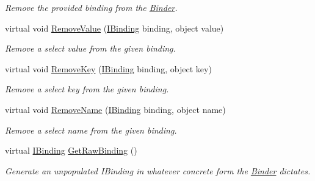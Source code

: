 \begin{DoxyCompactItemize}
\begin{DoxyCompactList}\small\item\em Remove the provided binding from the \hyperlink{classstrange_1_1framework_1_1impl_1_1_binder}{Binder}. \end{DoxyCompactList}\item 
\hypertarget{classstrange_1_1framework_1_1impl_1_1_binder_a09e00eb1f824e641fa287735a9f3b834}{virtual void \hyperlink{classstrange_1_1framework_1_1impl_1_1_binder_a09e00eb1f824e641fa287735a9f3b834}{Remove\-Value} (\hyperlink{interfacestrange_1_1framework_1_1api_1_1_i_binding}{I\-Binding} binding, object value)}\label{classstrange_1_1framework_1_1impl_1_1_binder_a09e00eb1f824e641fa287735a9f3b834}

\begin{DoxyCompactList}\small\item\em Remove a select value from the given binding. \end{DoxyCompactList}\item 
\hypertarget{classstrange_1_1framework_1_1impl_1_1_binder_a4cec7503f4f76e4f132665d89db49d99}{virtual void \hyperlink{classstrange_1_1framework_1_1impl_1_1_binder_a4cec7503f4f76e4f132665d89db49d99}{Remove\-Key} (\hyperlink{interfacestrange_1_1framework_1_1api_1_1_i_binding}{I\-Binding} binding, object key)}\label{classstrange_1_1framework_1_1impl_1_1_binder_a4cec7503f4f76e4f132665d89db49d99}

\begin{DoxyCompactList}\small\item\em Remove a select key from the given binding. \end{DoxyCompactList}\item 
\hypertarget{classstrange_1_1framework_1_1impl_1_1_binder_a834c55607151d7a30856e6b6f6a8df1e}{virtual void \hyperlink{classstrange_1_1framework_1_1impl_1_1_binder_a834c55607151d7a30856e6b6f6a8df1e}{Remove\-Name} (\hyperlink{interfacestrange_1_1framework_1_1api_1_1_i_binding}{I\-Binding} binding, object name)}\label{classstrange_1_1framework_1_1impl_1_1_binder_a834c55607151d7a30856e6b6f6a8df1e}

\begin{DoxyCompactList}\small\item\em Remove a select name from the given binding. \end{DoxyCompactList}\item 
\hypertarget{classstrange_1_1framework_1_1impl_1_1_binder_aa9e1ffe31a00f92c3edbbdc452301c03}{virtual \hyperlink{interfacestrange_1_1framework_1_1api_1_1_i_binding}{I\-Binding} \hyperlink{classstrange_1_1framework_1_1impl_1_1_binder_aa9e1ffe31a00f92c3edbbdc452301c03}{Get\-Raw\-Binding} ()}\label{classstrange_1_1framework_1_1impl_1_1_binder_aa9e1ffe31a00f92c3edbbdc452301c03}

\begin{DoxyCompactList}\small\item\em Generate an unpopulated I\-Binding in whatever concrete form the \hyperlink{classstrange_1_1framework_1_1impl_1_1_binder}{Binder} dictates. \end{DoxyCompactList}\end{DoxyCompactItemize}
